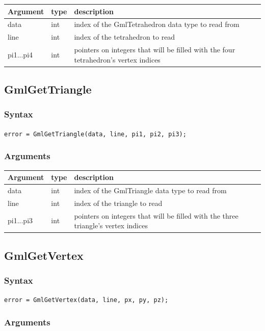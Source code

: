 \documentclass[a4paper,12pt]{article}
\begin{document}
\begin{tabular}{|m{2cm}|m{1.5cm}|m{10.5cm}|}
\hline
Argument   & type   & description \\
\hline
data       & int    & index of the GmlTetrahedron data type to read from \\
\hline
line       & int    & index of the tetrahedron to read \\
\hline
pi1...pi4  & int    & pointers on integers that will be filled with the four tetrahedron's vertex indices \\
\hline
\end{tabular}


\subsection{GmlGetTriangle}
\subsubsection*{Syntax}
{\tt error = GmlGetTriangle(data, line, pi1, pi2, pi3);}
\subsubsection*{Arguments}

\begin{tabular}{|m{2cm}|m{1.5cm}|m{10.5cm}|}
\hline
Argument   & type   & description \\
\hline
data       & int    & index of the GmlTriangle data type to read from \\
\hline
line       & int    & index of the triangle to read \\
\hline
pi1...pi3  & int    & pointers on integers that will be filled with the three triangle's vertex indices \\
\hline
\end{tabular}


\subsection{GmlGetVertex}
\subsubsection*{Syntax}
{\tt error = GmlGetVertex(data, line, px, py, pz);}
\subsubsection*{Arguments}
\end{document}
